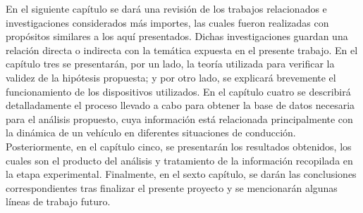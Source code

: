 En el siguiente capítulo se dará una revisión de los trabajos relacionados e investigaciones considerados más importes, las cuales fueron realizadas con propósitos similares a los aquí presentados. 
Dichas investigaciones guardan una relación directa o indirecta con la temática expuesta en el presente trabajo.
En el capítulo tres se presentarán, por un lado, la teoría utilizada para verificar la validez de la hipótesis propuesta; y por otro lado, se explicará brevemente el funcionamiento de los dispositivos utilizados.
En el capítulo cuatro se describirá detalladamente el proceso llevado a cabo para obtener la base de datos necesaria para el análisis propuesto, cuya información está relacionada principalmente con la dinámica de un vehículo en diferentes situaciones de conducción.
Posteriormente, en el capítulo cinco, se presentarán los resultados obtenidos, los cuales son el producto del análisis y tratamiento de la información recopilada en la etapa experimental.
Finalmente, en el sexto capítulo, se darán las conclusiones correspondientes tras finalizar el presente proyecto y se mencionarán algunas líneas de trabajo futuro.

